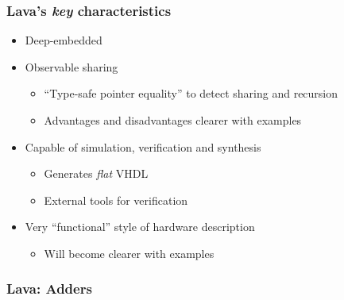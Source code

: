 \documentclass{beamer}
\begin{document}
            \begin{frame}
                \frametitle{Lava's \emph{key} characteristics}

                \begin{itemize}
                    \item Deep-embedded
                    \item Observable sharing
                        \begin{itemize}
                            \item ``Type-safe pointer equality'' to detect sharing and recursion
                            \item Advantages and disadvantages clearer with examples
                        \end{itemize}
                    \item Capable of simulation, verification and synthesis
                        \begin{itemize}
                            \item Generates \emph{flat} VHDL
                            \item External tools for verification
                        \end{itemize}
                    \item Very ``functional'' style of hardware description
                        \begin{itemize}
                            \item Will become clearer with examples
                        \end{itemize}
                \end{itemize}
            \end{frame}

            \begin{frame}
                \frametitle{Lava: Adders}
            \end{frame}
\end{document}
